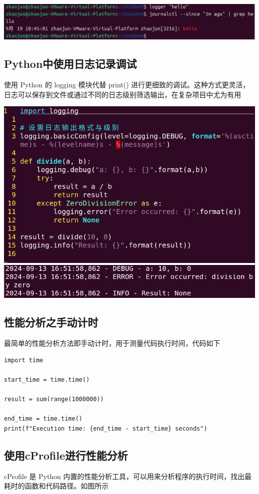 \documentclass[UTF8,a4paper]{ctexart}
\begin{document}
\begin{sloppypar}
	\includegraphics[width = 16cm]{1}
	
	\subsection{Python中使用日志记录调试}
	使用 Python 的 logging 模块代替 print() 进行更细致的调试。这种方式更灵活，日志可以保存到文件或通过不同的日志级别筛选输出，在复杂项目中尤为有用
	
	\includegraphics[width = 16cm]{21}
	\includegraphics[width = 16cm]{22}
	
	\subsection{性能分析之手动计时}
	最简单的性能分析方法即手动计时，用于测量代码执行时间，代码如下
	\begin{lstlisting}
import time

start_time = time.time()

result = sum(range(1000000))

end_time = time.time()
print(f"Execution time: {end_time - start_time} seconds")
	\end{lstlisting}
	
	\subsection{使用cProfile进行性能分析}
	cProfile 是 Python 内置的性能分析工具，可以用来分析程序的执行时间，找出最耗时的函数和代码路径。如图所示
	

\end{sloppypar}
\end{document}
